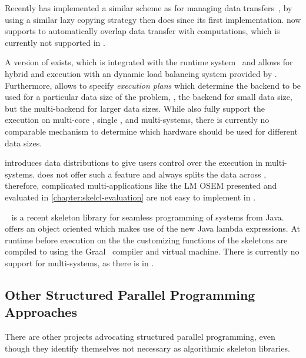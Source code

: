 Recently \SkePU has implemented a similar scheme as \SkelCL for managing data transfers~\cite{DastgeerKe14}, by using a similar lazy copying strategy then \SkelCL does since its first implementation.
\SkePU now supports to automatically overlap data transfer with computations, which is currently not supported in \SkelCL.

A version of \SkePU exists, which is integrated with the \StarPU runtime system~\cite{AugonnetTNW09} and allows for hybrid \CPU and \GPU execution with an dynamic load balancing system provided by \StarPU.
Furthermore, \SkePU allows to specify \emph{execution plans} which determine the backend to be used for a particular data size of the problem, \eg, the \OpenMP backend for small data size, but the \CUDA multi-\GPU backend for larger data sizes.
While \SkelCL also fully support the execution on multi-core \CPUs, single \GPUs, and  multi-\GPU systems, there is currently no comparable mechanism to determine which hardware should be used for different data sizes.

\SkelCL introduces data distributions to give users control over the execution in multi-\GPU systems.
\SkePU does not offer such a feature and always splits the data across \GPUs, therefore, complicated multi-\GPU applications like the LM OSEM presented and evaluated in \autoref{chapter:skelcl-evaluation} are not easy to implement in \SkePU.

\bigskip

\emph{\JPAI}~\cite{FumeroStDu2014} is a recent skeleton library for seamless programming of \GPU systems from Java.
\JPAI offers an object oriented \API which makes use of the new Java lambda expressions.
At runtime before execution on the \GPU the customizing functions of the skeletons are compiled to \OpenCL using the Graal~\cite{DuboscqStWuSiWiMo2013} compiler and virtual machine.
There is currently no support for multi-\GPU systems, as there is in \SkelCL.


\subsection[Other Structured Parallel Programming\\ Approaches]{Other Structured Parallel Programming Approaches}
There are other projects advocating structured parallel programming, even though they identify themselves not necessary as algorithmic skeleton libraries.

\bigskip

